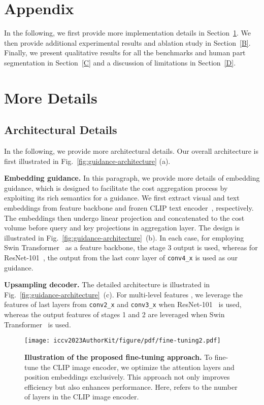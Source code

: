 \documentclass[10pt,twocolumn,letterpaper]{article}
\begin{document}
\section*{Appendix}
In the following, we first provide more implementation details in Section~\ref{A}. We then provide additional experimental results and ablation study in Section~\ref{B}. Finally, we present qualitative results for all the benchmarks and human part segmentation in Section~\ref{C} and a discussion of limitations in Section~\ref{D}.


\section{More Details}\label{A}
\subsection{Architectural Details}

In the following, we provide more architectural details. Our overall architecture is first illustrated in Fig.~\ref{fig:guidance-architecture} (a).

\smallbreak
\noindent\textbf{Embedding guidance.}
In this paragraph, we provide more details of embedding guidance, which is designed to facilitate the cost aggregation process by exploiting its rich semantics for a guidance.  We first extract visual and text embeddings from feature backbone and frozen CLIP text encoder~\cite{radford2021learning}, respectively. The embeddings then undergo linear projection and concatenated to the cost volume before query and key projections in aggregation layer. The design is illustrated in Fig.~\ref{fig:guidance-architecture}~(b). In each case, for employing Swin Transformer~\cite{liu2021swin} as a feature backbone, the stage 3 output is used, whereas for ResNet-101~\cite{he2016deep}, the output from the last conv layer of \texttt{conv4\_x} is used as our guidance.

\smallbreak
\noindent\textbf{Upsampling decoder.}
The detailed architecture is illustrated in Fig.~\ref{fig:guidance-architecture}~(c). For multi-level features , we leverage the features of last layers from \texttt{conv2\_x} and \texttt{conv3\_x} when ResNet-101~\cite{he2016deep} is used, whereas the output features of stages 1 and 2 are leveraged when Swin Transformer~\cite{liu2021swin} is used. 





\begin{figure}[t]
    \centering
    \texttt{[image: iccv2023AuthorKit/figure/pdf/fine-tuning2.pdf]}\hfill\\
    \vspace{-5pt}
    \caption{\textbf{Illustration of the proposed fine-tuning approach.} To fine-tune the CLIP image encoder, we optimize the attention layers and position embeddings exclusively. This approach not only improves efficiency but also enhances performance. Here,  refers to the number of layers in the CLIP image encoder.}
    \label{fig:fine-tune}\vspace{-5pt}
\end{figure} 
\end{document}
